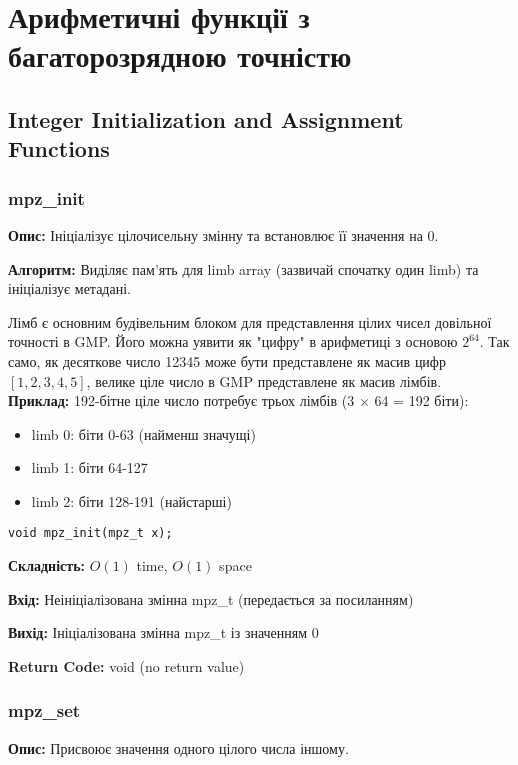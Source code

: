 \newpage
\section{Арифметичні функції з багаторозрядною точністю}

\subsection{Integer Initialization and Assignment Functions}

\subsubsection{mpz\_init}
\textbf{Опис:} Ініціалізує цілочисельну змінну та встановлює її значення на 0.

\textbf{Алгоритм:} Виділяє пам'ять для limb array (зазвичай спочатку один limb) та ініціалізує метадані.

\begin{remark}
    Лімб є основним будівельним блоком для представлення цілих чисел довільної точності в GMP. Його можна уявити як 
    "цифру"{} в арифметиці з основою $2^{64}$. Так само, як десяткове число 12345 може бути представлене як масив 
    цифр $[1, 2, 3, 4, 5]$, велике ціле число в GMP представлене як масив лімбів. \\
    \textbf{Приклад:} 192-бітне ціле число потребує трьох лімбів (3 $\times$ 64 = 192 біти):
    \begin{itemize}
        \item limb 0: біти 0-63 (найменш значущі)
        \item limb 1: біти 64-127
        \item limb 2: біти 128-191 (найстарші)
    \end{itemize}
\end{remark}

\begin{verbatim}
void mpz_init(mpz_t x);
\end{verbatim}

\textbf{Складність:} $O(1)$ time, $O(1)$ space

\textbf{Вхід:} Неініціалізована змінна mpz\_t (передається за посиланням)

\textbf{Вихід:} Ініціалізована змінна mpz\_t із значенням 0

\textbf{Return Code:} void (no return value)

\subsubsection{mpz\_set}
\textbf{Опис:} Присвоює значення одного цілого числа іншому.

